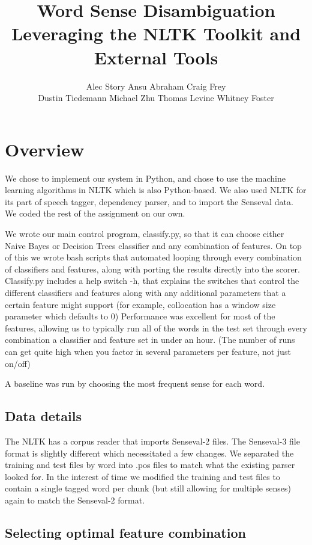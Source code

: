 \documentclass{article}
\title{Word Sense Disambiguation\\
\small{Leveraging the NLTK Toolkit and External Tools}}
\author{
Alec Story
Ansu Abraham
Craig Frey\\
Dustin Tiedemann
Michael Zhu
Thomas Levine
Whitney Foster\\
}
\begin{document}
\maketitle

\section{Overview}

We  chose to implement our system in Python, and chose to use the machine
learning algorithms in NLTK which is also Python-based.  We also used NLTK for
its part of speech tagger, dependency parser, and to import the Senseval data.
We coded the rest of the assignment on our own.

We wrote our main control program, classify.py, so that it can choose either
Naive Bayes or Decision Trees classifier and any 
combination of  features. On top of this we wrote bash scripts that automated
looping through every combination of classifiers and features, along with
porting the results directly into the scorer.  Classify.py includes a help
switch -h, that explains the switches that control the different classifiers
and features along with any additional parameters that a certain feature might
support (for example, collocation has a window size parameter which defaults to
0) Performance was excellent for most of the features, allowing us to typically
run all of the words in the test set through every combination a classifier and
feature set in under an hour. (The number of runs can get quite high when you
factor in several parameters per feature, not just on/off)

A baseline was run by choosing the most frequent sense for each word.

\subsection{Data details}

The  NLTK has a corpus reader  that imports Senseval-2 files. The Senseval-3
file format is slightly  different which necessitated a few changes. We
separated the training  and test files by word into .pos files to match  what
the existing  parser looked for. In the interest of time we modified  the
training and  test files to contain a single tagged word per chunk  (but still
allowing for multiple senses) again to match the Senseval-2  format.

\subsection{Selecting optimal feature combination}
\newcommand\ward{forward} %
\end{document}
